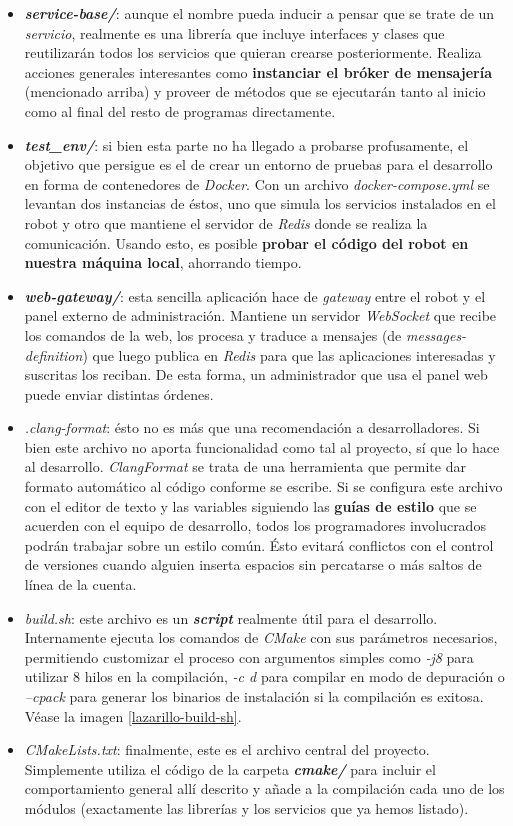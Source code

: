 \begin{itemize}
	\item \textit{\textbf{service-base/}}: aunque el nombre pueda inducir a pensar que se trate de un \textit{servicio}, realmente es una librería que incluye interfaces y clases que reutilizarán todos los servicios que quieran crearse posteriormente. Realiza acciones generales interesantes como \textbf{instanciar el bróker de mensajería} (mencionado arriba) y proveer de métodos que se ejecutarán tanto al inicio como al final del resto de programas directamente.
	\item \textit{\textbf{test\_env/}}: si bien esta parte no ha llegado a probarse profusamente, el objetivo que persigue es el de crear un entorno de pruebas para el desarrollo en forma de contenedores de \textit{Docker}. Con un archivo \emph{docker-compose.yml} se levantan dos instancias de éstos, uno que simula los servicios instalados en el robot y otro que mantiene el servidor de \textit{Redis} donde se realiza la comunicación. Usando esto, es posible \textbf{probar el código del robot en nuestra máquina local}, ahorrando tiempo.
	\item \textit{\textbf{web-gateway/}}: esta sencilla aplicación hace de \textit{gateway} entre el robot y el panel externo de administración. Mantiene un servidor \textit{WebSocket} que recibe los comandos de la web, los procesa y traduce a mensajes (de \textit{messages-definition}) que luego publica en \textit{Redis} para que las aplicaciones interesadas y suscritas los reciban. De esta forma, un administrador que usa el panel web puede enviar distintas órdenes.
	\item \textit{.clang-format}: ésto no es más que una recomendación a desarrolladores. Si bien este archivo no aporta funcionalidad como tal al proyecto, sí que lo hace al desarrollo. \textit{ClangFormat} \cite{clang-format} se trata de una herramienta que permite dar formato automático al código conforme se escribe. Si se configura este archivo con el editor de texto y las variables siguiendo las \textbf{guías de estilo} que se acuerden con el equipo de desarrollo, todos los programadores involucrados podrán trabajar sobre un estilo común. Ésto evitará conflictos con el control de versiones cuando alguien inserta espacios sin percatarse o más saltos de línea de la cuenta.
	\item \textit{build.sh}: este archivo es un \textbf{\textit{script}} realmente útil para el desarrollo. Internamente ejecuta los comandos de \textit{CMake} con sus parámetros necesarios, permitiendo customizar el proceso con argumentos simples como \emph{-j8} para utilizar 8 hilos en la compilación, \emph{-c d} para compilar en modo de depuración o \emph{--cpack} para generar los binarios de instalación si la compilación es exitosa. Véase la imagen \ref{lazarillo-build-sh}.
	\item \textit{CMakeLists.txt}: finalmente, este es el archivo central del proyecto. Simplemente utiliza el código de la carpeta \textbf{\textit{cmake/}} para incluir el comportamiento general allí descrito y añade a la compilación cada uno de los módulos (exactamente las librerías y los servicios que ya hemos listado).
\end{itemize}

